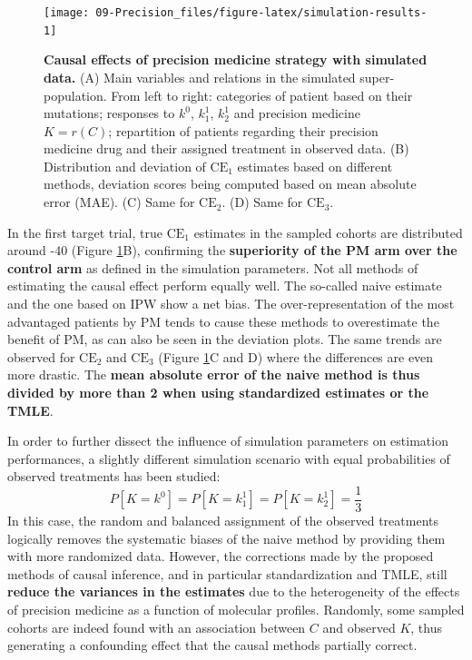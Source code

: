 \documentclass[a4paper,12pt,twoside,onecolumn,openright,final,oldfontcommands]{memoir}
\begin{document}
\begin{figure}

{\centering \texttt{[image: 09-Precision\_files/figure-latex/simulation-results-1]} 

}

\caption[Causal effects of precision medicine strategy with simulated data]{\textbf{Causal effects of precision
medicine strategy with simulated data.} (A) Main variables and relations
in the simulated super-population. From left to right: categories of
patient based on their mutations; responses to \(k^0\), \(k^1_1\),
\(k^1_2\) and precision medicine \(K=r(C)\); repartition of patients
regarding their precision medicine drug and their assigned treatment in
observed data. (B) Distribution and deviation of \(\text{CE}_1\)
estimates based on different methods, deviation scores being computed
based on mean absolute error (MAE). (C) Same for \(\text{CE}_2\). (D)
Same for \(\text{CE}_3\).}\label{fig:simulation-results}
\end{figure}












In the first target trial, true \(\text{CE}_1\) estimates in the sampled
cohorts are distributed around -40 (Figure
\ref{fig:simulation-results}B), confirming the \textbf{superiority of
the PM arm over the control arm} as defined in the simulation
parameters. Not all methods of estimating the causal effect perform
equally well. The so-called naive estimate and the one based on IPW show
a net bias. The over-representation of the most advantaged patients by
PM tends to cause these methods to overestimate the benefit of PM, as
can also be seen in the deviation plots. The same trends are observed
for \(\text{CE}_2\) and \(\text{CE}_3\) (Figure
\ref{fig:simulation-results}C and D) where the differences are even more
drastic. The \textbf{mean absolute error of the naive method is thus
divided by more than 2 when using standardized estimates or the TMLE}.

In order to further dissect the influence of simulation parameters on
estimation performances, a slightly different simulation scenario with
equal probabilities of observed treatments has been studied:
\[P[K=k^0]=P[K=k^1_1]=P[K=k^1_2]=\dfrac{1}{3}\] In this case, the random
and balanced assignment of the observed treatments logically removes the
systematic biases of the naive method by providing them with more
randomized data. However, the corrections made by the proposed methods
of causal inference, and in particular standardization and TMLE, still
\textbf{reduce the variances in the estimates} due to the heterogeneity
of the effects of precision medicine as a function of molecular
profiles. Randomly, some sampled cohorts are indeed found with an
association between \(C\) and observed \(K\), thus generating a
confounding effect that the causal methods partially correct.
\end{document}
